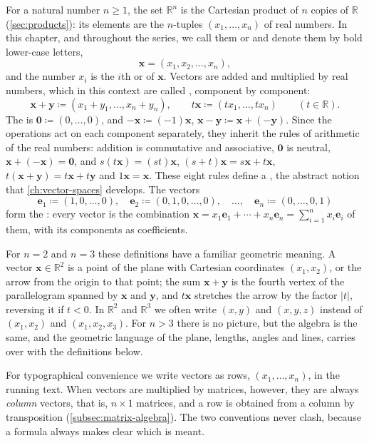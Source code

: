 For a natural number $n\ge1$, the set $\mathbb R^n$ is the Cartesian product of $n$ copies of $\mathbb R$ (\cref{sec:products}): its elements are the $n$-tuples $(x_1,\ldots,x_n)$ of real numbers. In this chapter, and throughout the series, we call them  or  and denote them by bold lower-case letters,
\[
\mathbf x=(x_1,x_2,\ldots,x_n),
\]
and the number $x_i$ is the $i$th  or  of $\mathbf x$. Vectors are added and multiplied by real numbers, which in this context are called , component by component:
\[
\mathbf x+\mathbf y\coloneqq(x_1+y_1,\ldots,x_n+y_n),\qquad t\mathbf x\coloneqq(tx_1,\ldots,tx_n)\qquad(t\in\mathbb R).
\]
The  is $\mathbf 0\coloneqq(0,\ldots,0)$, and $-\mathbf x\coloneqq(-1)\mathbf x$, $\mathbf x-\mathbf y\coloneqq\mathbf x+(-\mathbf y)$. Since the operations act on each component separately, they inherit the rules of arithmetic of the real numbers: addition is commutative and associative, $\mathbf 0$ is neutral, $\mathbf x+(-\mathbf x)=\mathbf 0$, and $s(t\mathbf x)=(st)\mathbf x$, $(s+t)\mathbf x=s\mathbf x+t\mathbf x$, $t(\mathbf x+\mathbf y)=t\mathbf x+t\mathbf y$ and $1\mathbf x=\mathbf x$. These eight rules define a , the abstract notion that \cref{ch:vector-spaces} develops. The vectors
\[
\mathbf e_1\coloneqq(1,0,\ldots,0),\quad\mathbf e_2\coloneqq(0,1,0,\ldots,0),\quad\ldots,\quad\mathbf e_n\coloneqq(0,\ldots,0,1)
\]
form the : every vector is the combination $\mathbf x=x_1\mathbf e_1+\cdots+x_n\mathbf e_n=\sum_{i=1}^nx_i\mathbf e_i$ of them, with its components as coefficients.

For $n=2$ and $n=3$ these definitions have a familiar geometric meaning. A vector $\mathbf x\in\mathbb R^2$ is a point of the plane with Cartesian coordinates $(x_1,x_2)$, or the arrow from the origin to that point; the sum $\mathbf x+\mathbf y$ is the fourth vertex of the parallelogram spanned by $\mathbf x$ and $\mathbf y$, and $t\mathbf x$ stretches the arrow by the factor $|t|$, reversing it if $t<0$. In $\mathbb R^2$ and $\mathbb R^3$ we often write $(x,y)$ and $(x,y,z)$ instead of $(x_1,x_2)$ and $(x_1,x_2,x_3)$. For $n>3$ there is no picture, but the algebra is the same, and the geometric language of the plane, lengths, angles and lines, carries over with the definitions below.

For typographical convenience we write vectors as rows, $(x_1,\ldots,x_n)$, in the running text. When vectors are multiplied by matrices, however, they are always \emph{column} vectors, that is, $n\times1$ matrices, and a row is obtained from a column by transposition (\cref{subsec:matrix-algebra}). The two conventions never clash, because a formula always makes clear which is meant.

